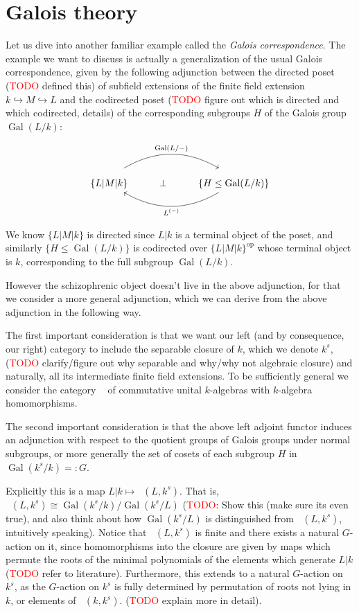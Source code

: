 \documentclass[12pt,a4paper]{article}
\DeclareMathOperator{\Gal}{Gal}
\DeclareMathOperator{\CAlgk}{CAlg_k}
\DeclareMathOperator{\op}{op}
\begin{document}
 \section{Galois theory}
 Let us dive into another familiar example called the \emph{Galois correspondence}. The example we want to discuss is actually a generalization of the usual Galois correspondence, given by the following adjunction between the directed poset (\textcolor{red}{TODO} defined this) of subfield extensions of the finite field extension $k \hookrightarrow M\hookrightarrow L$ and the codirected poset (\textcolor{red}{TODO} figure out which is directed and which codirected, details) of the corresponding subgroups $H$ of the Galois group $\Gal(L/k)$:
 
 \[\begin{tikzcd}
	{\{L|M|k\} } & \bot & {\{H \leq \Gal(L/k)\}}
	\arrow["{\Gal(L/-)}", shift left=3, bend left, from=1-1, to=1-3]
	\arrow["{L^{(-)}}", bend left, from=1-3, to=1-1]
\end{tikzcd}\]

We know ${\{L|M|k\} }$ is directed since $L|k$ is a terminal object of the poset, and similarly ${\{H \leq \Gal(L/k)\}}$ is codirected over ${\{L|M|k\} }^{\op}$ whose terminal object is $k$, corresponding to the full subgroup $\Gal(L/k)$. 

However the schizophrenic object doesn't live in the above adjunction, for that we consider a more general adjunction, which we can derive from the above adjunction in the following way. 

The first important consideration is that we want our left (and by consequence, our right) category to include the separable closure of $k$, which we denote $k^s$, (\textcolor{red}{TODO} clarify/figure out why separable and why/why not algebraic closure) and naturally, all its intermediate finite field extensions. To be sufficiently general we consider the category $\CAlgk$  of commutative unital $k$-algebras with $k$-algebra homomorphisms. 

The second important consideration is that the above left adjoint functor induces an adjunction with respect to the quotient groups of Galois groups under normal subgroups, or more generally the set of cosets of each subgroup $H$ in $\Gal(k^s/k) =: G$.

Explicitly this is a map $L|k \mapsto \CAlgk(L, k^s)$. That is, $\CAlgk(L, k^s) \cong \Gal(k^s/k)/\Gal(k^s/L)$ (\textcolor{red}{TODO}: Show this (make sure its even true), and also think about how $\Gal(k^s/L)$ is distinguished from $\CAlgk(L, k^s)$, intuitively speaking). Notice that $\CAlgk(L,k^s)$ is finite and there exists a natural $G$-action on it, since homomorphisms into the closure are given by maps which permute the roots of the minimal polynomials of the elements which generate $L|k$ (\textcolor{red}{TODO} refer to literature). Furthermore, this extends to a natural $G$-action on $k^s$, as the $G$-action on $k^s$ is fully determined by permutation of roots not lying in $k$, or elements of $\CAlgk(k,k^s)$. (\textcolor{red}{TODO} explain more in detail). 
\end{document}
